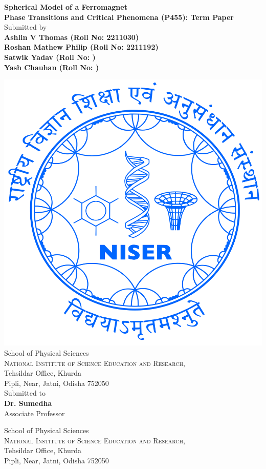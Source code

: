 \documentclass{article}
\begin{document}
\begin{titlepage}

\begin{center}



\textup{\Large {\bf Spherical Model of a Ferromagnet}}\\[0.3in]

\textbf {Phase Transitions and Critical Phenomena (P455): Term Paper}\\[0.7in]


       

\normalsize Submitted by \\
\textbf{Ashlin V Thomas (Roll No: 2211030)}\\
\textbf{Roshan Mathew Philip (Roll No: 2211192)}\\
\textbf{Satwik Yadav (Roll No: )}\\
\textbf{Yash Chauhan (Roll No: )}\\
\normalsize
\vspace{1 cm}

\includegraphics[width=0.25 \textwidth]{Images/NISER.png}\\[0.1in]
\Large{School of Physical Sciences}\\
\normalsize
\textsc{National Institute of Science Education and Research},\\
Tehsildar Office, Khurda\\
Pipli, Near, Jatni, Odisha 752050\\

\vspace{.4in}
Submitted to \\
\large\textbf{Dr. Sumedha}\\
\normalsize
Associate Professor

\Large{School of Physical Sciences}\\
\normalsize
\textsc{National Institute of Science Education and Research},\\
Tehsildar Office, Khurda\\
Pipli, Near, Jatni, Odisha 752050\\
\end{center}

\end{titlepage}
\restoregeometry
\end{document}
